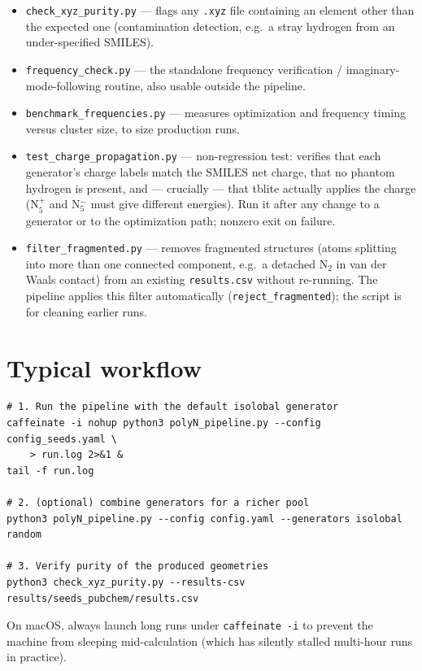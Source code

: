 \documentclass[11pt,a4paper]{article}
\begin{document}
\begin{itemize}[itemsep=3pt]
  \item \texttt{check\_xyz\_purity.py} --- flags any \texttt{.xyz} file
    containing an element other than the expected one (contamination
    detection, e.g.\ a stray hydrogen from an under-specified SMILES).
  \item \texttt{frequency\_check.py} --- the standalone frequency
    verification / imaginary-mode-following routine, also usable outside the
    pipeline.
  \item \texttt{benchmark\_frequencies.py} --- measures optimization and
    frequency timing versus cluster size, to size production runs.
  \item \texttt{test\_charge\_propagation.py} --- non-regression test:
    verifies that each generator's charge labels match the SMILES net
    charge, that no phantom hydrogen is present, and --- crucially --- that
    tblite actually applies the charge (N$_5^{+}$ and N$_5^{-}$ must give
    different energies). Run it after any change to a generator or to the
    optimization path; nonzero exit on failure.
  \item \texttt{filter\_fragmented.py} --- removes fragmented structures
    (atoms splitting into more than one connected component, e.g.\ a detached
    N$_2$ in van der Waals contact) from an existing \texttt{results.csv}
    without re-running. The pipeline applies this filter automatically
    (\texttt{reject\_fragmented}); the script is for cleaning earlier runs.
\end{itemize}

\section{Typical workflow}

\begin{lstlisting}
# 1. Run the pipeline with the default isolobal generator
caffeinate -i nohup python3 polyN_pipeline.py --config config_seeds.yaml \
    > run.log 2>&1 &
tail -f run.log

# 2. (optional) combine generators for a richer pool
python3 polyN_pipeline.py --config config.yaml --generators isolobal random

# 3. Verify purity of the produced geometries
python3 check_xyz_purity.py --results-csv results/seeds_pubchem/results.csv
\end{lstlisting}

\begin{remark}
On macOS, always launch long runs under \texttt{caffeinate -i} to prevent the
machine from sleeping mid-calculation (which has silently stalled multi-hour
runs in practice).
\end{remark}
\end{document}
